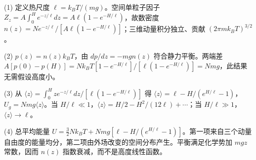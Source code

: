 (1) 定义热尺度 \(\ell=k_BT/(mg)\)。空间单粒子因子 \(Z_z=A\int_0^He^{-z/\ell}dz=A\ell(1-e^{-H/\ell})\)，故数密度 \(n(z)=Ne^{-z/\ell}/[A\ell(1-e^{-H/\ell})]\)；三维动量积分独立、贡献 \((2\pi mk_BT)^{3/2}\)。

(2) \(p(z)=n(z)k_BT\)，由 \(dp/dz=-mgn(z)\) 符合静力平衡。两端差 \(A[p(0)-p(H)]=Nk_BT[1-e^{-H/\ell}]/[\ell(1-e^{-H/\ell})]=Nmg\)，此结果无需假设高度小。

(3) 从 \(\langle z\rangle=\int_0^Hz e^{-z/\ell}dz/[\ell(1-e^{-H/\ell})]\) 得 \(\langle z\rangle=\ell-H/(e^{H/\ell}-1)\)，\(U_g=Nmg\langle z\rangle\)。当 \(H/\ell\ll1\)，\(\langle z\rangle=H/2-H^2/(12\ell)+\cdots\)；当 \(H/\ell\gg1\)，\(\langle z\rangle\to\ell\)。

(4) 总平均能量 \(U=\frac32Nk_BT+Nmg[\ell-H/(e^{H/\ell}-1)]\)。第一项来自三个动量自由度的能量均分，第二项由外场改变的空间分布产生。平衡满足化学势加 \(mgz\) 常数，因而 \(n(z)\) 指数衰减，而不是高度线性函数。
